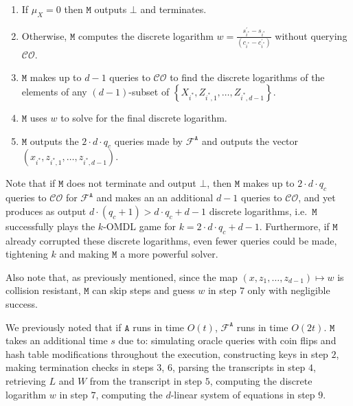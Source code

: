 \documentclass{mrl}
\theoremstyle{plain}
\theoremstyle{definition}
\begin{document}
\begin{enumerate}
\item If $\mu_X = 0$ then $\texttt{M}$ outputs $\bot$ and terminates.

\item Otherwise, $\texttt{M}$ computes the discrete logarithm
$w = \frac{s_{i^*}^\prime - s_{i^*}}{(c_{i^*} - c_{i^*}^\prime)}$ without querying $\mathcal{CO}$.

\item $\texttt{M}$ makes up to $d-1$ queries to $\mathcal{CO}$ to find the discrete logarithms of the elements of any $(d-1)$-subset of $\left\{X_{i^*}, Z_{i^*, 1}, \ldots, Z_{i^*, d-1}\right\}$.

\item $\texttt{M}$ uses $w$ to solve for the final discrete logarithm. 

\item $\texttt{M}$ outputs the $2 \cdot d \cdot q_c$ queries made by $\mathcal{F}^{\texttt{A}}$ and outputs the vector $(x_{i^*}, z_{i^*, 1}, \ldots, z_{i^*, d-1})$.

\end{enumerate}

Note that if $\texttt{M}$ does not terminate and output $\bot$, then $\texttt{M}$ makes up to $2\cdot d \cdot q_c$ queries to $\mathcal{CO}$ for $\mathcal{F}^{\texttt{A}}$ and makes an an additional $d-1$ queries to $\mathcal{CO}$, and yet produces as output $d \cdot (q_c + 1) > d \cdot q_c + d-1$ discrete logarithms, i.e.\ $\texttt{M}$ successfully plays the $k$-OMDL game for $k = 2\cdot d\cdot q_c + d-1$. Furthermore,  if $\texttt{M}$ already corrupted these discrete logarithms, even fewer queries could be made, tightening $k$ and making $\texttt{M}$ a more powerful solver. 

Also note that, as previously mentioned, since the map $(x, z_1, \ldots, z_{d-1}) \mapsto w$ is collision resistant, $\texttt{M}$ can skip steps and guess $w$ in step $7$ only with negligible success.

We previously noted that if $\texttt{A}$ runs in time $O(t)$, $\mathcal{F}^{\texttt{A}}$ runs in time $O(2t)$. $\texttt{M}$ takes an additional  time $s$ due to: simulating oracle queries with coin flips and hash table modifications throughout the execution, constructing keys in step $2$,  making termination checks in steps $3$, $6$, parsing the transcripts in step $4$, retrieving $L$ and $W$ from the transcript in step $5$, computing the discrete logarithm $w$ in step $7$, computing the $d$-linear system of equations in step $9$.
\end{document}
